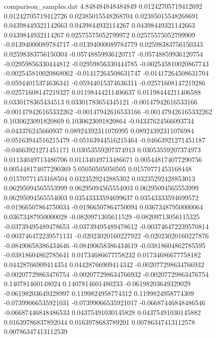 \begin{filecontents}{comparison_samples.dat}
4.848484848484849   0.01242705719412692     0.01242705719412726     0.02385015548268704    0.02385015548268691    0.04398449321142663    0.0439844932114267     0.04398449321142663    0.0439844932114267     0.02575575052799972    0.02575575052799909    -0.01394000089784717    -0.01394000089784779    0.02598383756150343    0.02598383756150304    -0.05748859936120717    -0.05748859936120754    -0.02959856330444812    -0.02959856330444785    -0.002545810020867743   -0.002545810020868062   -0.01417264508631747    -0.01417264508631704    -0.05944015374636341    -0.05944015374636311    -0.02571608147219286    -0.02571608147219327    0.01198444211406637    0.01198444211406588    0.0330178365434513     0.03301783654345121    -0.00147942616533166    -0.001479426165332262   -0.00147942616533166    -0.001479426165332262   0.1030623091820869     0.1030623091820864     -0.04337624566093734    -0.043376245660937      0.08924392311076995    0.08924392311076984    -0.05163944516215479    -0.05163944516215464    -0.04663921271451187    -0.04663921271451171    0.03053559207374913    0.03053559207374973    0.01134049713486706    0.01134049713486671    0.005448174077290756    0.005448174077290369  
5.05050505050505    0.01570771453168448     0.01570771453168504     0.0323529242885302     0.03235292428853013    0.06295094565553999    0.06295094565554003    0.06295094565553999    0.06295094565554003    0.03543333594699637    0.03543333594699572    -0.01966507864750034    -0.01966507864750094    0.03673487950000064    0.03673487950000028    -0.0820971305611529     -0.08209713056115325    -0.03739495489478653    -0.03739495489478612    -0.003746472239570814   -0.003746472239571131   -0.02023020160227922    -0.02023020160227876    -0.08490658386434646    -0.08490658386434619    -0.03818604862785595    -0.03818604862785641    0.01734686677758232    0.01734686677758182    0.04428766909414354    0.04428766909414342    -0.002077298634766932   -0.00207729863476754    -0.002077298634766932   -0.00207729863476754    0.140781460148024      0.1407814601480233     -0.06198203649329029    -0.06198203649328997    0.1199824958774312     0.1199824958774309     -0.07399066535921031    -0.07399066535921017    -0.06687446848486546    -0.06687446848486533    0.04375491030145828    0.04375491030145882    0.01639786837892044    0.0163978683789201     0.00786347413112578     0.00786347413112539   

\end{filecontents}
